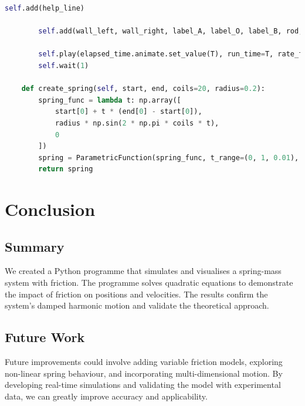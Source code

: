 \documentclass[12pt, a4paper, oneside]{report}
\begin{document}
\begin{lstlisting}[language=Python, caption=Manim Simulation Code]
        self.add(help_line)

        self.add(wall_left, wall_right, label_A, label_O, label_B, rod, spring, slider_box, position_vector, vector_label, velocity_vector, velocity_label, friction_force_vector, friction_force_label, spring_force_vector, spring_force_label)

        self.play(elapsed_time.animate.set_value(T), run_time=T, rate_func=linear)
        self.wait(1)

    def create_spring(self, start, end, coils=20, radius=0.2):
        spring_func = lambda t: np.array([
            start[0] + t * (end[0] - start[0]),
            radius * np.sin(2 * np.pi * coils * t),
            0
        ])
        spring = ParametricFunction(spring_func, t_range=(0, 1, 0.01), color=WHITE)
        return spring
\end{lstlisting}







\chapter{Conclusion}

\section{Summary}

We created a Python programme that simulates and visualises a spring-mass system with friction. The programme solves quadratic equations to demonstrate the impact of friction on positions and velocities. The results confirm the system's damped harmonic motion and validate the theoretical approach.


\section{Future Work}

Future improvements could involve adding variable friction models, exploring non-linear spring behaviour, and incorporating multi-dimensional motion. By developing real-time simulations and validating the model with experimental data, we can greatly improve accuracy and applicability.
\end{document}
